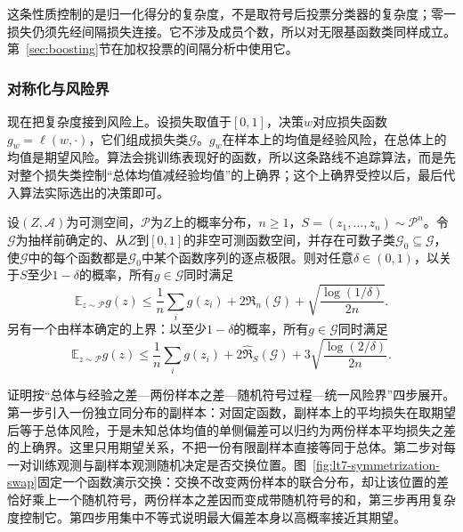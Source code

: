 这条性质控制的是归一化得分的复杂度，不是取符号后投票分类器的复杂度；零一损失仍须先经间隔损失连接。它不涉及成员个数，所以对无限基函数类同样成立。第~\ref{sec:boosting}节在加权投票的间隔分析中使用它。
\subsubsection{对称化与风险界}
\label{sec:rademacher-symmetrization-bound}

现在把复杂度接到风险上。设损失取值于$[0,1]$，决策$w$对应损失函数$g_w=\ell(w,\cdot)$，它们组成损失类$\mathcal G$。$g_w$在样本上的均值是经验风险，在总体上的均值是期望风险。算法会挑训练表现好的函数，所以这条路线不追踪算法，而是先对整个损失类控制“总体均值减经验均值”的上确界；这个上确界受控以后，最后代入算法实际选出的决策即可。

\begin{theorem}[Rademacher复杂度给出的期望风险上界]
\label{thm:rademacher-risk-bound}
设$(Z,\mathcal A)$为可测空间，$\mathcal P$为$Z$上的概率分布，$n\geq1$，$S=(z_1,\ldots,z_n)\sim\mathcal P^n$。令$\mathcal G$为抽样前确定的、从$Z$到$[0,1]$的非空可测函数空间，并存在可数子类$\mathcal G_0\subseteq\mathcal G$，使$\mathcal G$中的每个函数都是$\mathcal G_0$中某个函数序列的逐点极限。则对任意$\delta\in(0,1)$，以关于$S$至少$1-\delta$的概率，所有$g\in\mathcal G$同时满足
\begin{equation}
 \mathbb E_{z\sim\mathcal P}g(z)
 \leq\frac1n\sum_i g(z_i)+2\mathfrak R_n(\mathcal G)
 +\sqrt{\frac{\log(1/\delta)}{2n}}.
 \label{eq:rademacher-risk-bound}
\end{equation}
另有一个由样本确定的上界：以至少$1-\delta$的概率，所有$g\in\mathcal G$同时满足
\begin{equation}
 \mathbb E_{z\sim\mathcal P}g(z)
 \leq\frac1n\sum_i g(z_i)+2\widehat{\mathfrak R}_S(\mathcal G)
 +3\sqrt{\frac{\log(2/\delta)}{2n}}.
 \label{eq:empirical-rademacher-risk-bound}
\end{equation}
\end{theorem}

证明按“总体与经验之差—两份样本之差—随机符号过程—统一风险界”四步展开。第一步引入一份独立同分布的副样本：对固定函数，副样本上的平均损失在取期望后等于总体风险，于是未知总体均值的单侧偏差可以归约为两份样本平均损失之差的上确界。这里只用期望关系，不把一份有限副样本直接等同于总体。第二步对每一对训练观测与副样本观测随机决定是否交换位置。图~\ref{fig:lt7-symmetrization-swap}固定一个函数演示交换：交换不改变两份样本的联合分布，却让该位置的差恰好乘上一个随机符号，两份样本之差因而变成带随机符号的和，第三步再用复杂度控制它。第四步用集中不等式说明最大偏差本身以高概率接近其期望。

